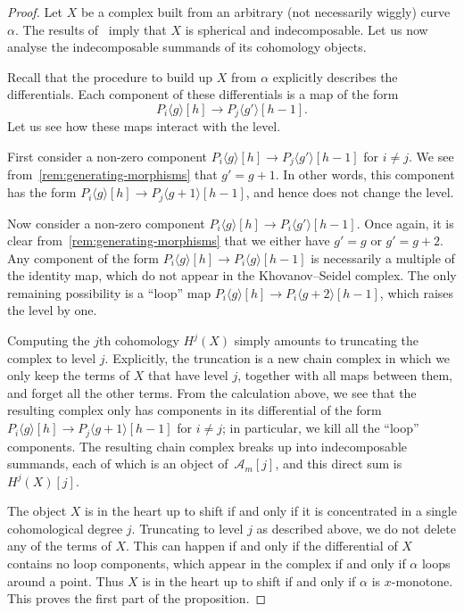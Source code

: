 \documentclass{amsart}
\theoremstyle{definition}
\begin{document}
\begin{proof}
  Let \(X\) be a complex built from an arbitrary (not necessarily wiggly) curve \(\alpha\).
  The results of~\cite{kho.sei:02} imply that \(X\) is spherical and indecomposable.
  Let us now analyse the indecomposable summands of its cohomology objects.
  
  Recall that the procedure to build up \(X\) from \(\alpha\) explicitly describes the differentials.    
  Each component of these differentials is a map of the form
  \[P_i\langle g \rangle[h] \to P_j\langle g' \rangle[h-1].\]
  Let us see how these maps interact with the level.
  
  First consider a non-zero component \(P_i\langle g \rangle[h] \to P_j\langle g' \rangle[h-1]\) for \(i \neq j\).
  We see from~\cref{rem:generating-morphisms} that \(g' = g+1\).
  In other words, this component has the form
  \(P_i\langle g \rangle[h] \to P_j\langle g+1 \rangle[h-1]\),
  and hence does not change the level.
  
  Now consider a non-zero component \(P_i\langle g \rangle[h] \to P_i\langle g' \rangle[h-1]\).
  Once again, it is clear from~\cref{rem:generating-morphisms} that we either have \(g' = g\) or \(g' = g + 2\).
  Any component of the form \(P_i \langle g \rangle[h] \to P_i\langle g \rangle[h-1]\)
  is necessarily a multiple of the identity map, which do not appear in the Khovanov--Seidel complex.
  The only remaining possibility is a ``loop'' map \(P_i \langle g \rangle[h] \to P_i\langle g+2 \rangle[h-1]\), which raises the level by one.

  Computing the \(j\)th cohomology \(H^j(X)\) simply amounts to truncating the complex to level \(j\).
  Explicitly, the truncation is a new chain complex in which we only keep the terms of \(X\) that have level \(j\), together with all maps between them, and forget all the other terms.
  From the calculation above, we see that the resulting complex only has components in its differential of the form \(P_i\langle g \rangle[h] \to P_j\langle g+1 \rangle[h-1]\) for \(i \neq j\); in particular, we kill all the ``loop'' components.
  The resulting chain complex breaks up into indecomposable summands, each of which is an object of~\(\mathcal{A}_m[j]\), and this direct sum is \(H^j(X)[j]\).
  
  The object \(X\) is in the heart up to shift if and only if it is concentrated in a single cohomological degree \(j\).
  Truncating to level \(j\) as described above, we do not delete any of the terms of \(X\).
  This can happen if and only if the differential of \(X\) contains no loop components,
  which appear in the complex if and only if \(\alpha\) loops around a point.
  Thus \(X\) is in the heart up to shift if and only if \(\alpha\) is  \(x\)-monotone.
  This proves the first part of the proposition.


\end{proof}
\end{document}
